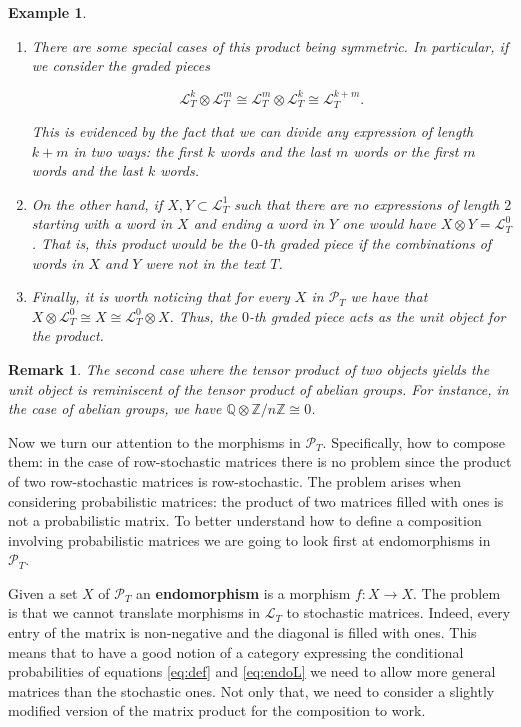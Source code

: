\documentclass[10pt,a4paper]{elsarticle}
\renewcommand{\Bbb}{\mathbb}
\newcommand{\Z}{\Bbb{Z}}
\newcommand{\Q}{\Bbb{Q}}
\renewcommand{\L}{\mathcal{L}}
\renewcommand{\P}{\mathcal{P}}
\newtheorem{exa}[theorem]{Example}
\newtheorem{re}[theorem]{Remark}
\begin{document}
\begin{exa}
	\begin{enumerate}
		\item There are some special cases of this product being symmetric. In particular, if we consider the graded pieces
		
		\begin{equation}
			\L_{T}^{k}\otimes\L_{T}^{m}\cong \L_{T}^{m}\otimes\L_{T}^{k} \cong \L_{T}^{k+m}.
		\end{equation}
		
		This is evidenced by the fact that we can divide any expression of length $k+m$ in two ways: the first $k$ words and the last $m$ words or the first $m$ words and the last $k$ words.
		
		\item On the other hand, if $X,Y \subset \L_{T}^{1}$ such that there are no expressions of length $2$ starting with a word in $X$ and ending a word in $Y$ one would have $X\otimes Y= \L_{T}^{0}$. That is, this product would be the $0$-th graded piece if the combinations of words in $X$ and $Y$ were not in the text $T$.
		
		\item Finally, it is worth noticing that for every $X$ in $\P_{T}$ we have that $X\otimes \L_{T}^{0}\cong X\cong \L_{T}^{0}\otimes X$. Thus, the $0$-th graded piece acts as the unit object for the product.
	\end{enumerate}
\end{exa}

\begin{re}
	The second case where the tensor product of two objects yields the unit object is reminiscent of the tensor product of abelian groups. For instance, in the case of abelian groups, we have $\Q\otimes \Z/n\Z\cong 0$.
\end{re}

Now we turn our attention to the morphisms in $\P_{T}$. Specifically, how to compose them: in the case of row-stochastic matrices there is no problem since the product of two row-stochastic matrices is row-stochastic. The problem arises when considering probabilistic matrices: the product of two matrices filled with ones is not a probabilistic matrix. To better understand how to define a composition involving probabilistic matrices we are going to look first at endomorphisms in $\P_{T}$.

Given a set $X$ of $\P_{T}$ an \textbf{endomorphism} is a morphism $f\colon X\to X$. The problem is that we cannot translate morphisms in $\L_{T}$ to stochastic matrices. Indeed, every entry of the matrix is non-negative and the diagonal is filled with ones. This means that to have a good notion of a category expressing the conditional probabilities of equations \eqref{eq:def} and \eqref{eq:endoL} we need to allow more general matrices than the stochastic ones. Not only that, we need to consider a slightly modified version of the matrix product for the composition to work.
\end{document}
